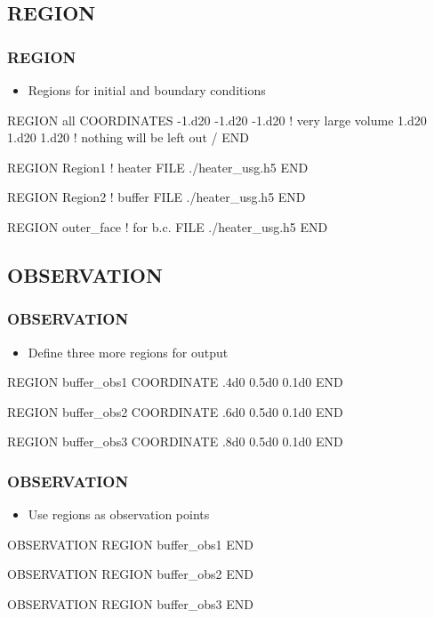 \documentclass{beamer}
\newcommand\bluecomment[1]{{{\color{blue} #1}}}
\newcommand\greencomment[1]{{{\color{green} #1}}}
\begin{document}
\subsection{REGION}

\begin{frame}[fragile]\frametitle{REGION}
\begin{itemize}
  \item{Regions for initial and boundary conditions}
\end{itemize}

\begin{semiverbatim}\small
REGION \greencomment{all}
  COORDINATES
    -1.d20 -1.d20 -1.d20 \bluecomment{! very large volume}
     1.d20  1.d20  1.d20 \bluecomment{! nothing will be left out}
  /
END

REGION \greencomment{Region1} \bluecomment{! heater}
  FILE ./heater_usg.h5
END

REGION \greencomment{Region2} \bluecomment{! buffer}
  FILE ./heater_usg.h5
END

REGION \greencomment{outer_face} \bluecomment{! for b.c.}
  FILE ./heater_usg.h5
END
\end{semiverbatim}
\end{frame}
\subsection{OBSERVATION}

\begin{frame}[fragile]\frametitle{OBSERVATION}
\begin{itemize}
  \item{Define three more regions for output}
\end{itemize}

\begin{semiverbatim}\small
REGION buffer_obs1
  COORDINATE .4d0 0.5d0 0.1d0
END

REGION buffer_obs2
  COORDINATE .6d0 0.5d0 0.1d0
END

REGION buffer_obs3
  COORDINATE .8d0 0.5d0 0.1d0
END
\end{semiverbatim}
\end{frame}

\begin{frame}[fragile]\frametitle{OBSERVATION}
\begin{itemize}
  \item{Use regions as observation points}
\end{itemize}

\begin{semiverbatim}\small
OBSERVATION
  REGION buffer_obs1
END

OBSERVATION
  REGION buffer_obs2
END

OBSERVATION
  REGION buffer_obs3
END
\end{semiverbatim}
\end{frame}
\end{document}
